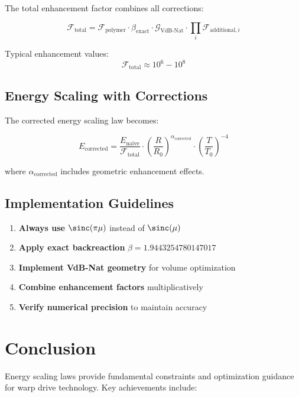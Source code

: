 \documentclass[12pt,a4paper]{article}
\begin{document}
The total enhancement factor combines all corrections:

\begin{equation}
\mathcal{F}_{\text{total}} = \mathcal{F}_{\text{polymer}} \cdot \beta_{\text{exact}} \cdot \mathcal{G}_{\text{VdB-Nat}} \cdot \prod_{i} \mathcal{F}_{\text{additional},i}
\end{equation}

Typical enhancement values:
\begin{equation}
\mathcal{F}_{\text{total}} \approx 10^6 - 10^8
\end{equation}

\subsection{Energy Scaling with Corrections}

The corrected energy scaling law becomes:

\begin{equation}
E_{\text{corrected}} = \frac{E_{\text{naive}}}{\mathcal{F}_{\text{total}}} \cdot \left(\frac{R}{R_0}\right)^{\alpha_{\text{corrected}}} \cdot \left(\frac{T}{T_0}\right)^{-4}
\end{equation}

where $\alpha_{\text{corrected}}$ includes geometric enhancement effects.

\subsection{Implementation Guidelines}

\begin{enumerate}
\item \textbf{Always use} $\sinc(\pi\mu)$ instead of $\sinc(\mu)$
\item \textbf{Apply exact backreaction} $\beta = 1.9443254780147017$
\item \textbf{Implement VdB-Nat geometry} for volume optimization
\item \textbf{Combine enhancement factors} multiplicatively
\item \textbf{Verify numerical precision} to maintain accuracy
\end{enumerate}

\section{Conclusion}

Energy scaling laws provide fundamental constraints and optimization guidance for warp drive technology. Key achievements include:
\end{document}
